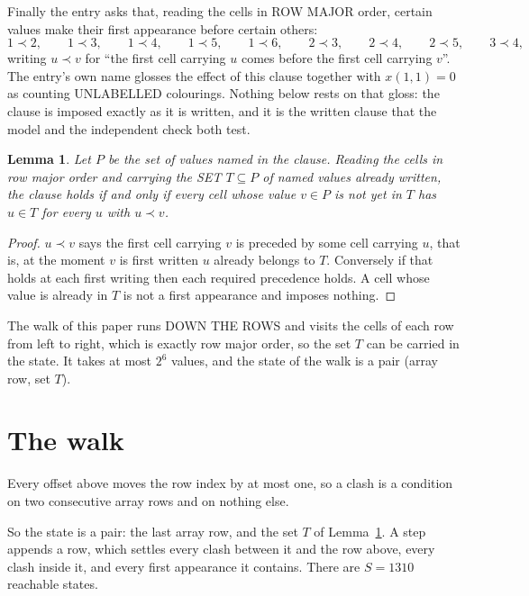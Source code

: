 \documentclass[11pt,a4paper]{article}
\theoremstyle{plain}
\newtheorem{lemma}[theorem]{Lemma}
\theoremstyle{definition}
\begin{document}
Finally the entry asks that, reading the cells in ROW MAJOR order, certain values make their
first appearance before certain others:
\[
1\prec 2,\qquad 1\prec 3,\qquad 1\prec 4,\qquad 1\prec 5,\qquad 1\prec 6,\qquad 2\prec 3,\qquad 2\prec 4,\qquad 2\prec 5,\qquad 3\prec 4 ,
\]
writing $u\prec v$ for ``the first cell carrying $u$ comes before the first cell carrying
$v$''. The entry's own name glosses the effect of this clause together with $x(1,1)=0$ as
counting UNLABELLED colourings. Nothing below rests on that gloss: the clause is imposed
exactly as it is written, and it is the written clause that the model and the independent
check both test.

\begin{lemma}\label{lem:seen}
Let $P$ be the set of values named in the clause. Reading the cells in row major order and
carrying the SET $T\subseteq P$ of named values already written, the clause holds if and only
if every cell whose value $v\in P$ is not yet in $T$ has $u\in T$ for every $u$ with $u\prec v$.
\end{lemma}

\begin{proof}
$u\prec v$ says the first cell carrying $v$ is preceded by some cell carrying $u$, that is, at
the moment $v$ is first written $u$ already belongs to $T$. Conversely if that holds at each
first writing then each required precedence holds. A cell whose value is already in $T$ is not
a first appearance and imposes nothing.
\end{proof}

The walk of this paper runs DOWN THE ROWS and visits the cells of each row from left to right,
which is exactly row major order, so the set $T$ can be carried in the state. It takes at most
$2^{6}$ values, and the state of the walk is a pair (array row, set $T$).

\section{The walk}

Every offset above moves the row index by at most one, so a clash is a condition on two
consecutive array rows and on nothing else.

So the state is a pair: the last array row, and the set $T$ of Lemma~\ref{lem:seen}. A step
appends a row, which settles every clash between it and the row above, every clash inside it,
and every first appearance it contains. There are $S=1310$ reachable states.
\end{document}
